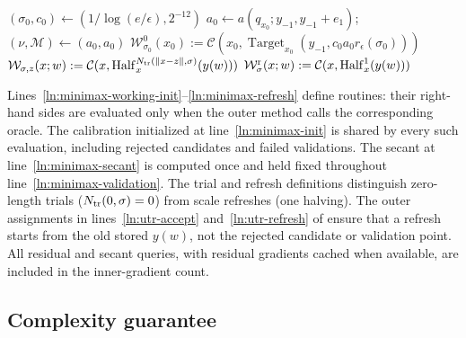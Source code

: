 \documentclass{article}
\begin{document}
\begin{algorithm}[H]
\DontPrintSemicolon
{}
\caption{Parameter-free minimax UTR with persistent SCAR}
\label{alg:gradient-scaled-scar}
$(\sigma_0,c_0)\leftarrow(1/\log(e/\epsilon),2^{-12})$\;
$a_0\leftarrow a(q_{x_0};y_{-1},y_{-1}+e_1)$;
 $(\nu,\mathcal M)\leftarrow(a_0,a_0)$\;
$\mathcal W^0_{\sigma_0}(x_0):=
 \mathcal C(x_0,\operatorname{Target}_{x_0}
              (y_{-1},c_0a_0r_\epsilon(\sigma_0)))$\;
$\mathcal W_{\sigma,z}(x;w):=
 \mathcal C(x,\operatorname{Half}_x^{N_{\rm tr}(\|x-z\|,\sigma)}
                      (y(w)))$\;
$\mathcal W^{\rm r}_\sigma(x;w):=
 \mathcal C(x,\operatorname{Half}_x^1(y(w)))$\;
\;
\end{algorithm}

Lines~\ref{ln:minimax-working-init}--\ref{ln:minimax-refresh} define
routines: their right-hand sides are evaluated only when the outer
method calls the corresponding oracle.  The calibration initialized
at line~\ref{ln:minimax-init} is shared by every such evaluation,
including rejected candidates and failed validations.  The secant
at line~\ref{ln:minimax-secant} is computed once and held fixed
throughout line~\ref{ln:minimax-validation}.
The trial and refresh definitions distinguish zero-length trials
($N_{\rm tr}(0,\sigma)=0$) from scale refreshes (one halving).
The outer assignments in lines~\ref{ln:utr-accept}
and~\ref{ln:utr-refresh} of  ensure that a
refresh starts from the old stored $y(w)$, not the rejected
candidate or validation point.  All residual and secant queries,
with residual gradients cached when available, are included in the
inner-gradient count.

\subsection{Complexity guarantee}
\end{document}

